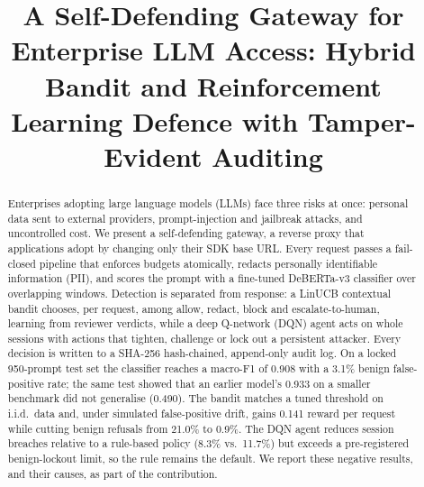 \documentclass[conference]{IEEEtran}
\begin{document}
\title{A Self-Defending Gateway for Enterprise LLM Access:
Hybrid Bandit and Reinforcement Learning Defence
with Tamper-Evident Auditing}

\author{
\and
{}
\and
{}
\and
{}
}

\maketitle

\begin{abstract}
Enterprises adopting large language models (LLMs) face three risks at once:
personal data sent to external providers, prompt-injection and jailbreak
attacks, and uncontrolled cost. We present a self-defending gateway, a
reverse proxy that applications adopt by changing only their SDK base URL.
Every request passes a fail-closed pipeline that enforces budgets
atomically, redacts personally identifiable information (PII), and scores
the prompt with a fine-tuned DeBERTa-v3 classifier over overlapping windows.
Detection is separated from response: a LinUCB contextual bandit chooses,
per request, among allow, redact, block and escalate-to-human, learning
from reviewer verdicts, while a deep Q-network (DQN) agent acts on whole
sessions with actions that tighten, challenge or lock out a persistent
attacker. Every decision is written to a SHA-256 hash-chained, append-only
audit log. On a locked 950-prompt test set the classifier reaches a
macro-F1 of 0.908 with a 3.1\% benign false-positive rate; the same test
showed that an earlier model's 0.933 on a smaller benchmark did not
generalise (0.490). The bandit matches a tuned threshold on i.i.d.\ data
and, under simulated false-positive drift, gains 0.141 reward per request
while cutting benign refusals from 21.0\% to 0.9\%. The DQN agent reduces
session breaches relative to a rule-based policy (8.3\% vs.\ 11.7\%) but
exceeds a pre-registered benign-lockout limit, so the rule remains the
default. We report these negative results, and their causes, as part of
the contribution.
\end{abstract}
\end{document}
